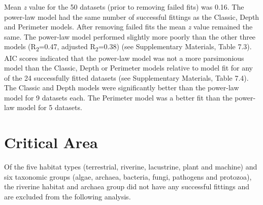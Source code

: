 {%
\noindent Mean \textit{z} value for the 50 datasets (prior to removing failed fits) was 0.16. The power-law model had the same number of successful fittings as the Classic, Depth and Perimeter models. After removing failed fits the mean \textit{z} value remained the same. The power-law model performed slightly more poorly than the other three models (R\textsubscript{2}=0.47, adjusted R\textsubscript{2}=0.38) (see Supplementary Materials, Table 7.3). AIC scores indicated that the power-law model was not a more parsimonious model than the Classic, Depth or Perimeter models relative to model fit for any of the 24 successfully fitted datasets (see Supplementary Materials, Table 7.4). The Classic and Depth models were significantly better than the power-law model for 9 datasets each. The Perimeter model was a better fit than the power-law model for 5 datasets.   
  
\section{Critical Area}
{\texorpdfstring
Off the five habitat types (terrestrial, riverine, lacustrine, plant and machine) and six taxonomic groups (algae, archaea, bacteria, fungi, pathogens and protozoa), the riverine habitat and archaea group did not have any successful fittings and are excluded from the following analysis.\\


}}
